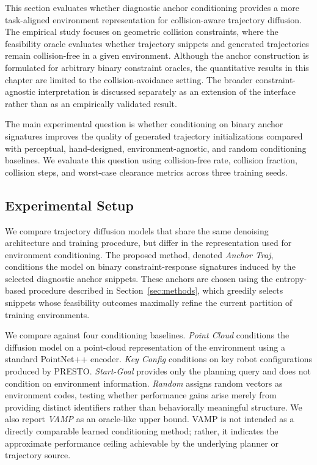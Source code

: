This section evaluates whether diagnostic anchor conditioning provides a more task-aligned environment representation for collision-aware trajectory diffusion. The empirical study focuses on geometric collision constraints, where the feasibility oracle evaluates whether trajectory snippets and generated trajectories remain collision-free in a given environment. Although the anchor construction is formulated for arbitrary binary constraint oracles, the quantitative results in this chapter are limited to the collision-avoidance setting. The broader constraint-agnostic interpretation is discussed separately as an extension of the interface rather than as an empirically validated result.

The main experimental question is whether conditioning on binary anchor signatures improves the quality of generated trajectory initializations compared with perceptual, hand-designed, environment-agnostic, and random conditioning baselines. We evaluate this question using collision-free rate, collision fraction, collision steps, and worst-case clearance metrics across three training seeds.

\subsection{Experimental Setup}

We compare trajectory diffusion models that share the same denoising architecture and training procedure, but differ in the representation used for environment conditioning. The proposed method, denoted \textit{Anchor Traj}, conditions the model on binary constraint-response signatures induced by the selected diagnostic anchor snippets. These anchors are chosen using the entropy-based procedure described in Section~\ref{sec:methods}, which greedily selects snippets whose feasibility outcomes maximally refine the current partition of training environments.

We compare against four conditioning baselines. \textit{Point Cloud} conditions the diffusion model on a point-cloud representation of the environment using a standard PointNet++ encoder. \textit{Key Config} conditions on key robot configurations produced by PRESTO. \textit{Start-Goal} provides only the planning query and does not condition on environment information. \textit{Random} assigns random vectors as environment codes, testing whether performance gains arise merely from providing distinct identifiers rather than behaviorally meaningful structure. We also report \textit{VAMP} as an oracle-like upper bound. VAMP is not intended as a directly comparable learned conditioning method; rather, it indicates the approximate performance ceiling achievable by the underlying planner or trajectory source.

